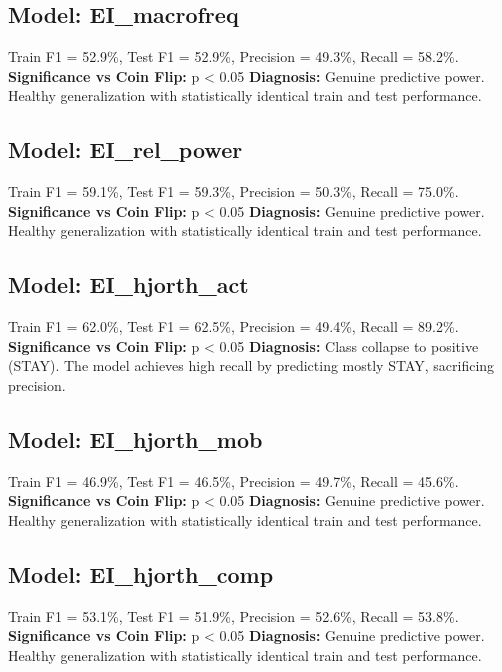 \subsection*{Model: EI_macrofreq}
Train F1 = 52.9\%, Test F1 = 52.9\%, Precision = 49.3\%, Recall = 58.2\%.
\newline
\textbf{Significance vs Coin Flip:} p < 0.05
\newline
\textbf{Diagnosis:} Genuine predictive power. Healthy generalization with statistically identical train and test performance.

\subsection*{Model: EI_rel_power}
Train F1 = 59.1\%, Test F1 = 59.3\%, Precision = 50.3\%, Recall = 75.0\%.
\newline
\textbf{Significance vs Coin Flip:} p < 0.05
\newline
\textbf{Diagnosis:} Genuine predictive power. Healthy generalization with statistically identical train and test performance.

\subsection*{Model: EI_hjorth_act}
Train F1 = 62.0\%, Test F1 = 62.5\%, Precision = 49.4\%, Recall = 89.2\%.
\newline
\textbf{Significance vs Coin Flip:} p < 0.05
\newline
\textbf{Diagnosis:} Class collapse to positive (STAY). The model achieves high recall by predicting mostly STAY, sacrificing precision.

\subsection*{Model: EI_hjorth_mob}
Train F1 = 46.9\%, Test F1 = 46.5\%, Precision = 49.7\%, Recall = 45.6\%.
\newline
\textbf{Significance vs Coin Flip:} p < 0.05
\newline
\textbf{Diagnosis:} Genuine predictive power. Healthy generalization with statistically identical train and test performance.

\subsection*{Model: EI_hjorth_comp}
Train F1 = 53.1\%, Test F1 = 51.9\%, Precision = 52.6\%, Recall = 53.8\%.
\newline
\textbf{Significance vs Coin Flip:} p < 0.05
\newline
\textbf{Diagnosis:} Genuine predictive power. Healthy generalization with statistically identical train and test performance.
